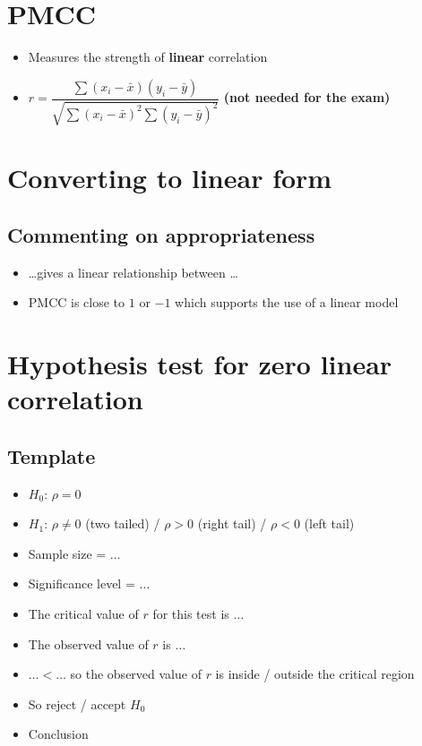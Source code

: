 
\section{PMCC}
\begin{itemize}
    \item Measures the strength of \textbf{linear} correlation
    \item $r =\dfrac{\sum\left(x_{i}-\bar{x}\right)\left(y_{i}-\bar{y}\right)}{\sqrt{\sum\left(x_{i}-\bar{x}\right)^{2} \sum\left(y_{i}-\bar{y}\right)^{2}}}$ \textbf{(not needed for the exam)}
\end{itemize}

\section{Converting to linear form}
\subsection{Commenting on appropriateness}
\begin{itemize}
    \item \dots gives a linear relationship between \dots
    \item PMCC is close to $1$ or $-1$ which supports the use of a linear model
\end{itemize}

\section{Hypothesis test for zero linear correlation}
\subsection{Template}
\begin{itemize}
    \item $H_0$: $\rho = 0$
    \item $H_1$: $\rho \neq 0$ (two tailed) / $\rho > 0$ (right tail) / $\rho < 0$ (left tail)
    \item Sample size = $\dots$
    \item Significance level = $\dots$
    \item The critical value of $r$ for this test is $\dots$
    \item The observed value of $r$ is $\dots$
    \item $\dots < \dots$ so the observed value of $r$ is inside / outside the critical region
    \item So reject / accept $H_0$
    \item Conclusion
\end{itemize}




